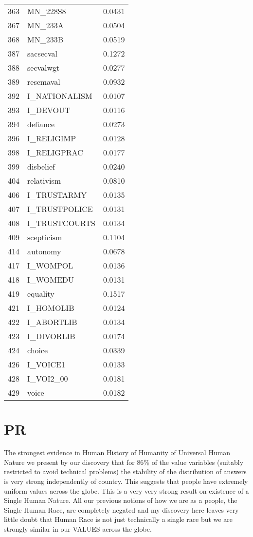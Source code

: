 \documentclass{amsart}
\begin{document}
\begin{longtable}{rlr}
  363 & MN\_228S8 & 0.0431 \\ 
  367 & MN\_233A & 0.0504 \\ 
  368 & MN\_233B & 0.0519 \\ 
  387 & sacsecval & 0.1272 \\ 
  388 & secvalwgt & 0.0277 \\ 
  389 & resemaval & 0.0932 \\ 
  392 & I\_NATIONALISM & 0.0107 \\ 
  393 & I\_DEVOUT & 0.0116 \\ 
  394 & defiance & 0.0273 \\ 
  396 & I\_RELIGIMP & 0.0128 \\ 
  398 & I\_RELIGPRAC & 0.0177 \\ 
  399 & disbelief & 0.0240 \\ 
  404 & relativism & 0.0810 \\ 
  406 & I\_TRUSTARMY & 0.0135 \\ 
  407 & I\_TRUSTPOLICE & 0.0131 \\ 
  408 & I\_TRUSTCOURTS & 0.0134 \\ 
  409 & scepticism & 0.1104 \\ 
  414 & autonomy & 0.0678 \\ 
  417 & I\_WOMPOL & 0.0136 \\ 
  418 & I\_WOMEDU & 0.0131 \\ 
  419 & equality & 0.1517 \\ 
  421 & I\_HOMOLIB & 0.0124 \\ 
  422 & I\_ABORTLIB & 0.0134 \\ 
  423 & I\_DIVORLIB & 0.0174 \\ 
  424 & choice & 0.0339 \\ 
  426 & I\_VOICE1 & 0.0133 \\ 
  428 & I\_VOI2\_00 & 0.0181 \\ 
  429 & voice & 0.0182 \\ 
   \hline
\hline
\end{longtable}

\section{PR}

The strongest evidence in Human History of Humanity of Universal Human Nature we present by our discovery that for 86\% of the value variables (suitably restricted to avoid technical problems) the stability of the distribution of answers is very strong independently of country.  This suggests that people have extremely uniform values across the globe.  This is a very very strong result on existence of a Single Human Nature.  All our previous notions of how we are as a people, the Single Human Race, are completely negated and my discovery here leaves very little doubt that Human Race is not just technically a single race but we are strongly similar in our VALUES across the globe.
\end{document}
